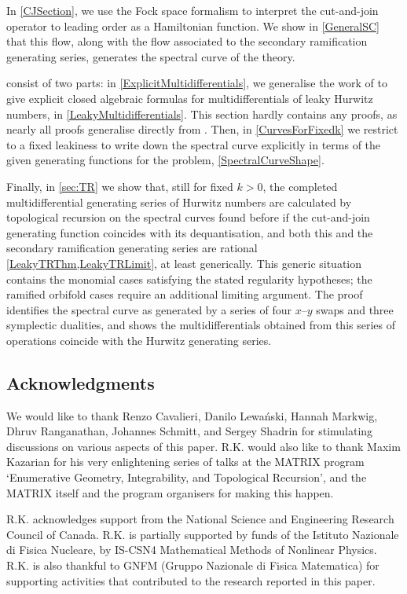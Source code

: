 \documentclass[10pt,a4paper,oneside,no-math,reqno]{amsart}%
\theoremstyle{plain}
\theoremstyle{definition}
\theoremstyle{remark}
\numberwithin{equation}{section}
\newcommand{\1}{\mathds{1}}
\newcommand{\<}{\langle}
\renewcommand{\>}{\rangle}
\begin{document}
In \cref{CJSection}, we use the Fock space formalism to interpret the cut-and-join operator to leading order as a Hamiltonian function. We show in \cref{GeneralSC} that this flow, along with the flow associated to the secondary ramification generating series, generates the spectral curve of the theory.

 consist of two parts: in \cref{ExplicitMultidifferentials}, we generalise the work of \cite{BDKS22} to give explicit closed algebraic formulas for multidifferentials of leaky Hurwitz numbers, in \cref{LeakyMultidifferentials}. This section hardly contains any proofs, as nearly all proofs generalise directly from \cite{BDKS22}. Then, in \cref{CurvesForFixedk} we restrict to a fixed leakiness to write down the spectral curve explicitly in terms of the given generating functions for the problem, \cref{SpectralCurveShape}.

Finally, in \cref{sec:TR} we show that, still for fixed $k >0$, the completed multidifferential generating series of Hurwitz numbers are calculated by topological recursion on the spectral curves found before if the cut-and-join generating function coincides with its dequantisation, and both this and the secondary ramification generating series are rational \cref{LeakyTRThm,LeakyTRLimit}, at least generically. This generic situation contains the monomial cases satisfying the stated regularity hypotheses; the ramified orbifold cases require an additional limiting argument.
The proof identifies the spectral curve as generated by a series of four $ x$--$y$ swaps and three symplectic dualities, and shows the multidifferentials obtained from this series of operations coincide with the Hurwitz generating series.

\subsection{Acknowledgments}

We would like to thank Renzo Cavalieri, Danilo Lewański, Hannah Markwig, Dhruv Ranganathan, Johannes Schmitt, and Sergey Shadrin for stimulating discussions on various aspects of this paper. R.K. would also like to thank Maxim Kazarian for his very enlightening series of talks at the MATRIX program `Enumerative Geometry, Integrability, and Topological Recursion', and the MATRIX itself and the program organisers for making this happen.

R.K. acknowledges support from the National Science and Engineering Research Council of Canada. R.K. is partially supported by funds of the Istituto Nazionale di Fisica Nucleare, by IS-CSN4 Mathematical Methods of Nonlinear Physics. R.K. is also thankful to GNFM (Gruppo Nazionale di Fisica Matematica) for supporting activities that contributed to the research reported in this paper.
\end{document}
